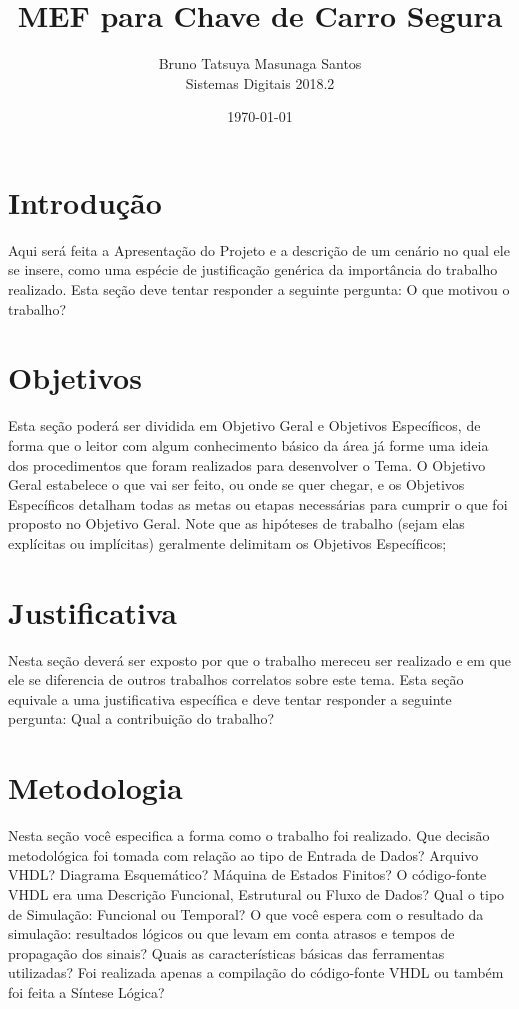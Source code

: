 \documentclass[12pt,a4paper]{article}
\title{MEF para Chave de Carro Segura}
\author{Bruno Tatsuya Masunaga Santos\\
        Sistemas Digitais 2018.2}
\date{\today}
\begin{document}
\maketitle

\section{Introdução}
Aqui será feita a Apresentação do Projeto e a descrição de um cenário no qual ele se
insere, como uma espécie de justificação genérica da importância do trabalho
realizado. Esta seção deve tentar responder a seguinte pergunta: O que motivou o
trabalho?

\section{Objetivos}
Esta seção poderá ser dividida em Objetivo Geral e Objetivos Específicos, de forma
que o leitor com algum conhecimento básico da área já forme uma ideia dos
procedimentos que foram realizados para desenvolver o Tema. O Objetivo Geral
estabelece o que vai ser feito, ou onde se quer chegar, e os Objetivos Específicos
detalham todas as metas ou etapas necessárias para cumprir o que foi proposto no
Objetivo Geral. Note que as hipóteses de trabalho (sejam elas explícitas ou implícitas)
geralmente delimitam os Objetivos Específicos;

\section{Justificativa}
Nesta seção deverá ser exposto por que o trabalho mereceu ser realizado e em que ele
se diferencia de outros trabalhos correlatos sobre este tema. Esta seção equivale a
uma justificativa específica e deve tentar responder a seguinte pergunta: Qual a
contribuição do trabalho?

\section{Metodologia}
Nesta seção você especifica a forma como o trabalho foi realizado. Que decisão
metodológica foi tomada com relação ao tipo de Entrada de Dados? Arquivo VHDL?
Diagrama Esquemático? Máquina de Estados Finitos? O código-fonte VHDL era uma
Descrição Funcional, Estrutural ou Fluxo de Dados? Qual o tipo de Simulação:
Funcional ou Temporal? O que você espera com o resultado da simulação: resultados
lógicos ou que levam em conta atrasos e tempos de propagação dos sinais? Quais as
características básicas das ferramentas utilizadas? Foi realizada apenas a compilação
do código-fonte VHDL ou também foi feita a Síntese Lógica?
\end{document}
